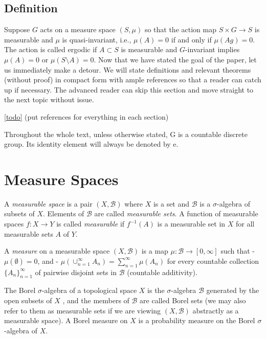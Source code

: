 \documentclass[
]{article}
\begin{document}
\hypertarget{definition}{%
\subsection{Definition}\label{definition}}

Suppose \(G\) acts on a measure space \((S, \mu)\) so that the action
map \(S \times G \rightarrow S\) is measurable and \(\mu\) is
quasi-invariant, i.e., \(\mu(A) = 0\) if and only if \(\mu(Ag) = 0\).
The action is called ergodic if \(A \subset S\) is measurable and
\(G\)-invariant implies \(\mu(A) = 0\) or \(\mu(S\setminus A) = 0\).
Now that we have stated the goal of the paper, let us immediately make a
detour. We will state definitions and relevant theorems (without proof)
in compact form with ample references so that a reader can catch up if
necessary. The advanced reader can skip this section and move straight
to the next topic without issue.

\href{ergodicity}{{[}todo{]}} (put references for everything in each
section)

Throughout the whole text, unless otherwise stated, G is a countable
discrete group. Its identity element will always be denoted by e.

\hypertarget{measure-spaces}{%
\section{Measure Spaces}\label{measure-spaces}}

A \emph{measurable space} is a pair \((X, \mathscr{B})\) where \(X\) is
a set and \(\mathscr{B}\) is a \(\sigma\)-algebra of subsets of \(X\).
Elements of \(\mathscr{B}\) are called \emph{measurable sets}. A
function of measurable spaces \(f: X \rightarrow Y\) is called
\emph{measurable} if \(f^{-1}(A)\) is a measurable set in \(X\) for all
measurable sets \(A\) of \(Y\).

A \emph{measure} on a measurable space \((X, \mathscr{B})\) is a map
\(\mu: \mathscr{B} \rightarrow [0, \infty]\) such that -
\(\mu(\emptyset) = 0\), and -
\(\mu(\cup_{n=1}^{\infty} A_n) = \sum_{n=1}^{\infty} \mu(A_n)\) for
every countable collection \(\{A_n\}_{n=1}^{\infty}\) of pairwise
disjoint sets in \(\mathscr{B}\) (countable additivity).

The Borel \(\sigma\)-algebra of a topological space \(X\) is the
\(\sigma\)-algebra \(\mathscr{B}\) generated by the open subsets of
\(X\) , and the members of \(\mathscr{B}\) are called Borel sets (we may
also refer to them as measurable sets if we are viewing
\((X, \mathscr{B})\) abstractly as a measurable space). A Borel measure
on \(X\) is a probability measure on the Borel \(\sigma\)-algebra of
\(X\).
\end{document}
